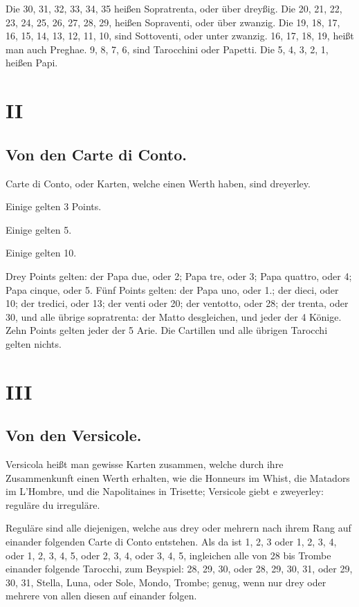 \documentclass[11pt,a6paper,twoside]{article}
\begin{document}
Die 30, 31, 32, 33, 34, 35 heißen Sopratrenta, oder über dreyßig. Die 20, 21, 22, 23, 24, 25, 26, 27, 28, 29, heißen Sopraventi, oder über zwanzig. Die 19, 18, 17, 16, 15, 14, 13, 12, 11, 10, sind Sottoventi, oder unter zwanzig. 16, 17, 18, 19, heißt man auch Preghae. 9, 8, 7, 6, sind Tarocchini oder Papetti. Die 5, 4, 3, 2, 1, heißen Papi.

\section{II}
\subsection{Von den Carte di Conto.}

Carte di Conto, oder Karten, welche einen Werth haben, sind dreyerley.

Einige gelten 3 Points.

Einige gelten 5.

Einige gelten 10.

Drey Points gelten: der Papa due, oder 2; Papa tre, oder 3; Papa quattro, oder 4; Papa cinque, oder 5. Fünf Points gelten: der Papa uno, oder 1.; der dieci, oder 10; der tredici, oder 13; der venti oder 20; der ventotto, oder 28; der trenta, oder 30, und alle übrige sopratrenta: der Matto desgleichen, und jeder der 4 Könige. Zehn Points gelten jeder der 5 Arie. Die Cartillen und alle übrigen Tarocchi gelten nichts.

\section{III}
\subsection{Von den Versicole.}

Versicola heißt man gewisse Karten zusammen, welche durch ihre Zusammenkunft einen Werth erhalten, wie die Honneurs im Whist, die Matadors im L'Hombre, und die Napolitaines in Trisette; Versicole giebt e zweyerley: reguläre du irreguläre.

Reguläre sind alle diejenigen, welche aus drey oder mehrern nach ihrem Rang auf einander folgenden Carte di Conto entstehen. Als da ist 1, 2, 3 oder 1, 2, 3, 4, oder 1, 2, 3, 4, 5, oder 2, 3, 4, oder 3, 4, 5, ingleichen alle von 28 bis Trombe einander folgende Tarocchi, zum Beyspiel: 28, 29, 30, oder 28, 29, 30, 31, oder 29, 30, 31, Stella, Luna, oder Sole, Mondo, Trombe; genug, wenn nur drey oder mehrere von allen diesen auf einander folgen.
\end{document}

